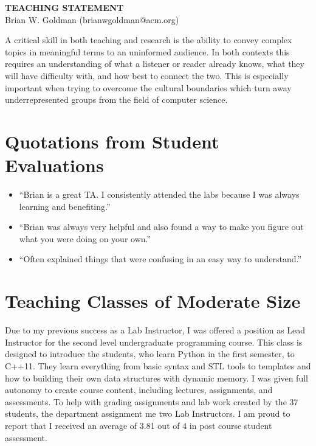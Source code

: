\documentclass[a4paper, 11pt]{article}
\begin{document}
\thispagestyle{empty}

\pagestyle{fancy}

\begin{center}
{\LARGE \bf TEACHING STATEMENT}\\
\vspace*{0.1cm}
{\normalsize Brian W. Goldman (brianwgoldman@acm.org)}
\end{center}

\noindent
A critical skill in both teaching and research is the ability to convey
complex topics in meaningful terms to an uninformed audience. In both
contexts this requires an understanding of what a listener or reader
already knows, what they will have difficulty with, and how best to
connect the two. This is especially important when trying to overcome
the cultural boundaries which turn away underrepresented groups from
the field of computer science.

\section{Quotations from Student Evaluations}
\begin{itemize}
\item ``Brian is a great TA. I consistently attended the labs because I was always learning and benefiting.''
\item ``Brian was always very helpful and also found a way to make you figure out what you were doing on your own.''
\item ``Often explained things that were confusing in an easy way to understand.''
\end{itemize}

\section{Teaching Classes of Moderate Size}
Due to my previous success as a Lab Instructor, I was offered a
position as Lead Instructor for the second level undergraduate
programming course. This class is designed to introduce the students,
who learn Python in the first semester, to C++11. They learn
everything from basic syntax and STL tools to templates and how
to building their own data structures with dynamic memory.
I was given full autonomy to create course content, including
lectures, assignments, and assessments. To help with grading
assignments and lab work created by the 37 students, the
department assignment me two Lab Instructors.
I am proud to report that I received an average
of 3.81 out of 4 in post course student assessment.
\end{document}
